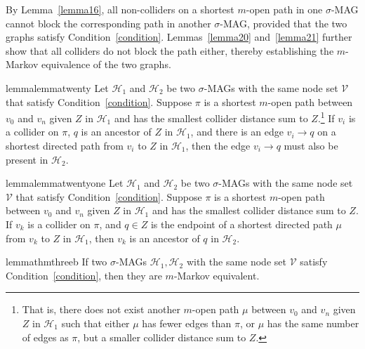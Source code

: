 \documentclass[accepted]{uai2025} %
\begin{document}
By Lemma~\ref{lemma16}, all non-colliders on a shortest \( m \)-open path in one \( \sigma \)-MAG cannot block the corresponding path in another \( \sigma \)-MAG, provided that the two graphs satisfy Condition~\ref{condition}. Lemmas~\ref{lemma20} and~\ref{lemma21} further show that all colliders do not block the path either, thereby establishing the \( m \)-Markov equivalence of the two graphs.

\begin{restatable}{lemma}{lemmatwenty} \label{lemma20}
Let \( \mathcal{H}_1 \) and \( \mathcal{H}_2 \) be two \( \sigma \)-MAGs with the same node set \( \mathcal{V} \) that satisfy Condition~\ref{condition}. Suppose \( \pi \) is a shortest $m$-open path between \( v_0 \) and \( v_n \) given \( Z \) in \( \mathcal{H}_1 \) and has the smallest collider distance sum to \( Z \).\footnote{That is, there does not exist another $m$-open path \( \mu \) between \( v_0 \) and \( v_n \) given \( Z \) in \( \mathcal{H}_1 \) such that either \( \mu \) has fewer edges than \( \pi \), or \( \mu \) has the same number of edges as \( \pi \), but a smaller collider distance sum to \( Z \).} If \( v_i \) is a collider on \( \pi \), \( q \) is an ancestor of \( Z \) in \( \mathcal{H}_1 \), and there is an edge \( v_i \rightarrow q \) on a shortest directed path from \( v_i \) to \( Z \) in \( \mathcal{H}_1 \), then the edge \( v_i \rightarrow q \) must also be present in \( \mathcal{H}_2 \).
\end{restatable}

\begin{restatable}{lemma}{lemmatwentyone} \label{lemma21}
Let \( \mathcal{H}_1 \) and \( \mathcal{H}_2 \) be two \( \sigma \)-MAGs with the same node set \( \mathcal{V} \) that satisfy Condition~\ref{condition}. Suppose \( \pi \) is a shortest $m$-open path between \( v_0 \) and \( v_n \) given \( Z \) in \( \mathcal{H}_1 \) and has the smallest collider distance sum to \( Z \). If \( v_k \) is a collider on \( \pi \), and \( q \in Z \) is the endpoint of a shortest directed path \( \mu \) from \( v_k \) to \( Z \) in \( \mathcal{H}_1 \), then \( v_k \) is an ancestor of \( q \) in \( \mathcal{H}_2 \).
\end{restatable}

\begin{restatable}{lemma}{thmthreeb} \label{thm3b}
If two \( \sigma \)-MAGs \( \mathcal{H}_1, \mathcal{H}_2 \) with the same node set \( \mathcal{V} \) satisfy Condition~\ref{condition}, then they are $m$-Markov equivalent.
\end{restatable}
\end{document}
